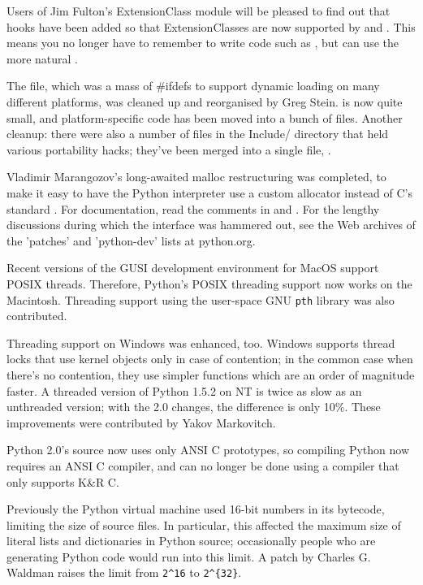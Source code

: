 \documentclass{howto}
\begin{document}
Users of Jim Fulton's ExtensionClass module will be pleased to find
out that hooks have been added so that ExtensionClasses are now
supported by  and .
This means you no longer have to remember to write code such as
, but can use the more natural
.

The  file, which was a mass of \#ifdefs to
support dynamic loading on many different platforms, was cleaned up
and reorganised by Greg Stein.   is now quite small,
and platform-specific code has been moved into a bunch of
 files.  Another cleanup: there were also a
number of  files in the Include/ directory that held
various portability hacks; they've been merged into a single file,
.

Vladimir Marangozov's long-awaited malloc restructuring was completed,
to make it easy to have the Python interpreter use a custom allocator
instead of C's standard .  For documentation, read
the comments in  and
.  For the lengthy discussions during which
the interface was hammered out, see the Web archives of the 'patches'
and 'python-dev' lists at python.org.

Recent versions of the GUSI development environment for MacOS support
POSIX threads.  Therefore, Python's POSIX threading support now works
on the Macintosh.  Threading support using the user-space GNU \texttt{pth}
library was also contributed.

Threading support on Windows was enhanced, too.  Windows supports
thread locks that use kernel objects only in case of contention; in
the common case when there's no contention, they use simpler functions
which are an order of magnitude faster.  A threaded version of Python
1.5.2 on NT is twice as slow as an unthreaded version; with the 2.0
changes, the difference is only 10\%.  These improvements were
contributed by Yakov Markovitch.

Python 2.0's source now uses only ANSI C prototypes, so compiling Python now
requires an ANSI C compiler, and can no longer be done using a compiler that
only supports K\&R C.  

Previously the Python virtual machine used 16-bit numbers in its
bytecode, limiting the size of source files.  In particular, this
affected the maximum size of literal lists and dictionaries in Python
source; occasionally people who are generating Python code would run into this limit.
A patch by Charles G. Waldman raises the limit from \verb|2^16| to \verb|2^{32}|.
\end{document}
